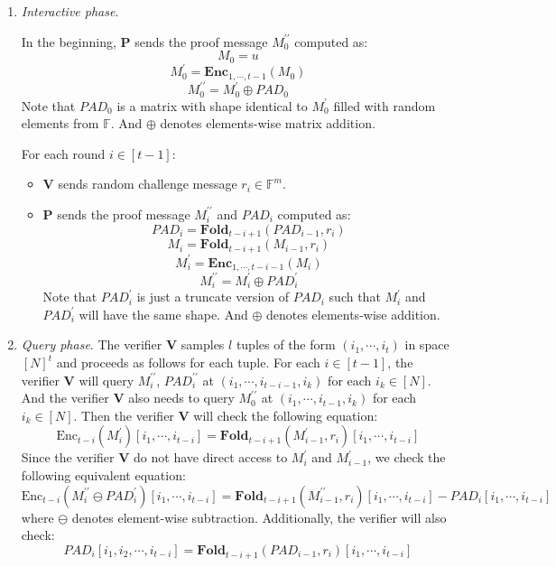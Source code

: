 \begin{enumerate}
    \item \textit{Interactive phase}. 
    
    In the beginning, $\textbf{P}$ sends the proof message $M_0^{\prime\prime}$ computed as:
$$
    M_0 = u
$$
$$
    M_0^{\prime} = \textbf{Enc}_{1,\cdots,t-1}(M_0)
$$
$$
    M_0^{\prime\prime} = M_0^{\prime} \oplus PAD_0
$$
    Note that $PAD_0$ is a matrix with shape identical to $M_0^\prime$ filled with random elements from $\mathbb{F}$. And $\oplus$ denotes elements-wise matrix addition.
    
    For each round $i \in [t-1]$:
    \begin{itemize}
        \item $\textbf{V}$ sends random challenge message $r_i \in \mathbb{F}^m$.
        \item $\textbf{P}$ sends the proof message $M_i^{\prime\prime}$ and $PAD_i$ computed as:
$$
    PAD_i = \textbf{Fold}_{t-i+1}(PAD_{i-1}, r_i)
$$
$$
    M_i = \textbf{Fold}_{t-i+1}(M_{i-1}, r_i)
$$
$$
    M_i^\prime =  \textbf{Enc}_{1, \cdots, t- i - 1}(M_i)
$$
$$
    M_i^{\prime\prime} = M_i^{\prime} \oplus PAD_i^\prime
$$
    Note that $PAD_i^\prime$ is just a truncate version of $PAD_i$ such that $M_i^{\prime}$ and $ PAD_i^\prime$ will have the same shape. And $\oplus$ denotes elements-wise addition.

    \end{itemize}
    \item \textit{Query phase}. The verifier $\textbf{V}$ samples $l$ tuples of the form $(i_1, \cdots, i_t)$ in space $[N]^t$ and proceeds as follows for each tuple. For each $i \in [t-1]$, the verifier $\textbf{V}$ will query $M_{i}^{\prime\prime}$, $PAD_{i}^{\prime\prime}$ at $(i_1, \cdots, i_{t-i-1}, i_k)$ for each $i_k \in [N]$. And the verifier $\textbf{V}$ also needs to query $M_{0}^{\prime\prime}$ at $(i_1, \cdots, i_{t-1}, i_k)$ for each $i_k \in [N]$. Then the verifier $\textbf{V}$ will check the following equation:
$$
    \text{Enc}_{t-i}(M_i^\prime)[i_1, \cdots, i_{t-i}] = \textbf{Fold}_{t-i+1}(M_{i-1}^\prime, r_i) [i_1, \cdots, i_{t-i}]
$$
Since the verifier $\textbf{V}$ do not have direct access to $M_i^\prime$ and $M_{i-1}^\prime$, we check the following equivalent equation:
\begin{equation}
\label{eq:szkpctc_eq}
    \text{Enc}_{t-i}(M_i^{\prime\prime} \ominus PAD_{i}^\prime)[i_1, \cdots, i_{t-i}] = \textbf{Fold}_{t-i+1}(M_{i-1}^{\prime\prime}, r_i) [i_1, \cdots, i_{t-i}] - PAD_i[i_1, \cdots, i_{t-i}]
\end{equation}
where $\ominus$ denotes element-wise subtraction.
Additionally, the verifier will also check:
\begin{equation}
\label{eq:szkpctc_eq2}
    PAD_i[i_1, i_2, \cdots, i_{t-i}] = \textbf{Fold}_{t-i+1}(PAD_{i-1}, r_i) [i_1, \cdots, i_{t-i}]
\end{equation}

\end{enumerate}

